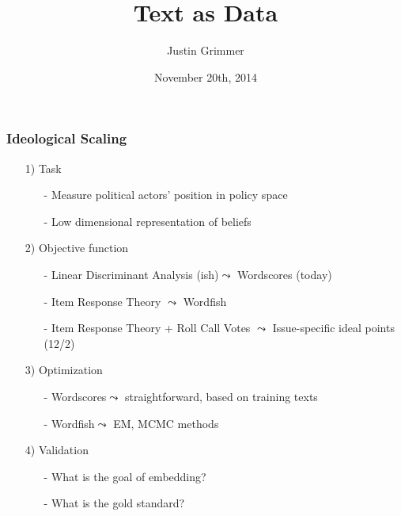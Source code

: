 \documentclass{beamer}
\title[Text as Data] %
{Text as Data}
\author{Justin Grimmer}
\institute[Stanford University]{Associate Professor\\Department of Political Science \\  Stanford University}
\date{November 20th, 2014}%
\begin{document}
\begin{frame}
\titlepage
\end{frame}


\begin{frame}
\frametitle{Ideological Scaling}
\begin{itemize}
\item[1)] Task
\begin{itemize}
\item[-] Measure political actors' position in policy space
\item[-] Low dimensional representation of beliefs
\end{itemize}
\item[2)] Objective function
\begin{itemize}
\item[-] Linear Discriminant Analysis (ish)$\leadsto$ Wordscores (today)
\item[-] Item Response Theory $\leadsto$ Wordfish 
\item[-] Item Response Theory + Roll Call Votes $\leadsto$ Issue-specific ideal points (12/2)
\end{itemize}
\item[3)] Optimization
\begin{itemize}
\item[-] Wordscores$\leadsto$ straightforward, based on training texts 
\item[-] Wordfish$\leadsto$ EM, MCMC methods
\end{itemize}
\item[4)] Validation
\begin{itemize}
\item[-] What is the goal of embedding?
\item[-] What is the \alert{gold standard}?
\end{itemize}
\end{itemize}


\end{frame}
\end{document}
